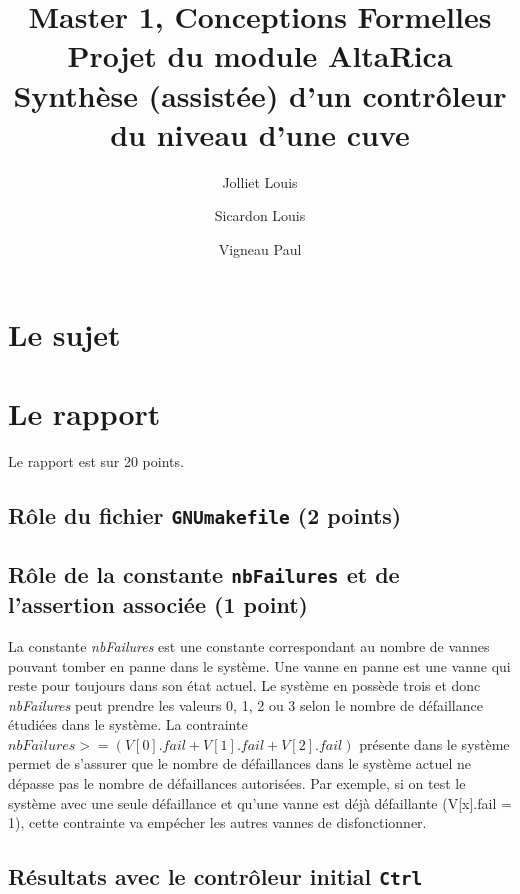 \documentclass[a4paper]{book}
\newcommand{\altarica}{{\sc AltaRica}}
\begin{document}
\title{Master 1, Conceptions Formelles\\
Projet du module \altarica\\
Synthèse (assistée) d'un contrôleur du niveau d'une cuve}

\date{}

\author{Jolliet Louis \and Sicardon Louis \and Vigneau Paul}

\maketitle

\chapter{Le sujet}


\chapter{Le rapport}
Le rapport est sur 20 points.

\section{Rôle du fichier {\tt GNUmakefile} (2 points)}

\section{Rôle de la constante {\tt nbFailures} et de l'assertion associée (1 point)}
La constante \textit{nbFailures} est une constante correspondant au nombre de vannes pouvant tomber en panne dans le système. Une vanne en panne est une vanne qui reste pour toujours dans son état actuel. Le système en possède trois et donc \textit{nbFailures} peut prendre les valeurs 0, 1, 2 ou 3 selon le nombre de défaillance étudiées dans le système. La contrainte $nbFailures >= (V [0].fail + V [1].fail + V [2].fail)$ présente dans le système permet de s’assurer que le nombre de défaillances dans le système actuel ne dépasse pas le nombre de défaillances autorisées. Par exemple, si on test le système avec une seule défaillance et qu'une vanne est déjà défaillante (V[x].fail = 1), cette contrainte va empécher les autres vannes de disfonctionner. 

\section{Résultats avec le contrôleur initial {\tt Ctrl}}
\end{document}
